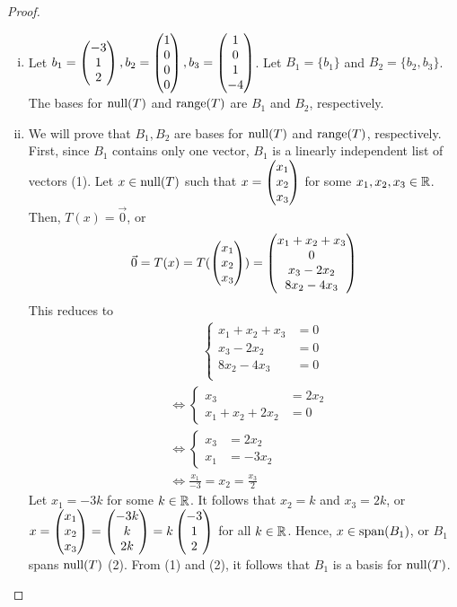 \begin{proof}
    \renewcommand{\qedsymbol}{$\blacksquare$}
    \begin{enumerate}[(i)]
        \item Let $b_1=\begin{pmatrix} -3\\ 1\\ 2\end{pmatrix},b_2=\begin{pmatrix} 1\\ 0\\0 \\ 0\end{pmatrix},b_3=\begin{pmatrix} 1\\ 0\\1 \\ -4\end{pmatrix}$. Let $B_1=\{b_1\}$ and $B_2=\{b_2,b_3\}$. The bases for $\textnormal{null}(T)$ and $\textnormal{range}(T)$ are $B_1$ and $B_2$, respectively.
        \item We will prove that $B_1,B_2$ are bases for $\textnormal{null}(T)$ and $\textnormal{range}(T)$, respectively. 
        First, since $B_1$ contains only one vector, $B_1$ is a linearly independent list of vectors (1).
        Let $x\in\textnormal{null}(T)$ such that $x=\begin{pmatrix} x_1\\ x_2\\ x_3\end{pmatrix}$ for some $x_1,x_2,x_3\in\mathbb R$.
        Then, $T(x)=\vec{0}$, or 
        \[
            \begin{aligned}
                \vec{0} = T(x) = T(\begin{pmatrix} x_1\\ x_2\\ x_3\end{pmatrix}) = \begin{pmatrix} x_1+x_2+x_3\\ 0\\x_3-2x_2 \\ 8x_2-4x_3\end{pmatrix}      
            \end{aligned}
        \]
        This reduces to
        \begin{align*}
            &\qquad \ \ \,
            \begin{cases}
                x_1+x_2+x_3&=0\\
                x_3-2x_2&=0\\
                8x_2-4x_3&=0\\
            \end{cases}\\&\iff
            \begin{cases}
                x_3&=2x_2\\
                x_1+x_2+2x_2&=0
            \end{cases}\\&\iff
            \begin{cases}
                x_3&=2x_2\\
                x_1&=-3x_2
            \end{cases}\\
            &\iff \frac{x_1}{-3}=x_2=\frac{x_3}{2}
        \end{align*}
        Let $x_1=-3k$ for some $k\in\mathbb R$. It follows that $x_2=k$ and $x_3=2k$, or $x=\begin{pmatrix} x_1\\ x_2\\ x_3\end{pmatrix}=\begin{pmatrix} -3k\\ k\\ 2k\end{pmatrix}=k \begin{pmatrix} -3\\ 1\\ 2\end{pmatrix}$ for all $k\in\mathbb R$. Hence, $x\in\textnormal{span}(B_1)$, or $B_1$ spans $\textnormal{null}(T)$ (2).
        From (1) and (2), it follows that $B_1$ is a basis for $\textnormal{null}(T)$.


\end{enumerate}
\end{proof}
